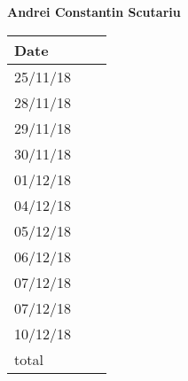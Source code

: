 \documentclass[../main.tex]{subfiles}
\begin{document}
\begin{center}
{\bf Andrei Constantin Scutariu}
	\vspace{2mm}

		\begin{tabular}{p{1.3cm}|p{1.8cm}|p{6.7cm}}
			\hline
			\bf Date & \bf \makebox[1.8cm][c]{Hours} & \bf \makebox[6.7cm][c]{Description} \\
			\hline
			25/11/18 & \makebox[1.8cm][c]{0.5h} & \makebox[6.7cm][c]{Initial Structure}\\
			28/11/18 & \makebox[1.8cm][c]{0.5h} & \makebox[6.7cm][c]{Introduction}\\
			29/11/18 & \makebox[1.8cm][c]{2h} & \makebox[6.7cm][c]{Component view}\\
			30/11/18 & \makebox[1.8cm][c]{1h} & \makebox[6.7cm][c]{Component view}\\
			01/12/18 & \makebox[1.8cm][c]{1h} & \makebox[6.7cm][c]{Requirements traceability}\\
			04/12/18 & \makebox[1.8cm][c]{2h} & \makebox[6.7cm][c]{Reviewing}\\
			05/12/18 & \makebox[1.8cm][c]{2h} & \makebox[6.7cm][c]{Architectural styles and patterns}\\
			06/12/18 & \makebox[1.8cm][c]{4h} & \makebox[6.7cm][c]{Component Interfaces}\\
			07/12/18 & \makebox[1.8cm][c]{1h} & \makebox[6.7cm][c]{Component view}\\
			07/12/18 & \makebox[1.8cm][c]{1h} & \makebox[6.7cm][c]{Reviewing}\\
			10/12/18 & \makebox[1.8cm][c]{3h} & \makebox[6.7cm][c]{Reviewing}\\
			total    & \makebox[1.8cm][c]{15h}
		\end{tabular}
\end{center}
\vspace{1cm}
\end{document}
